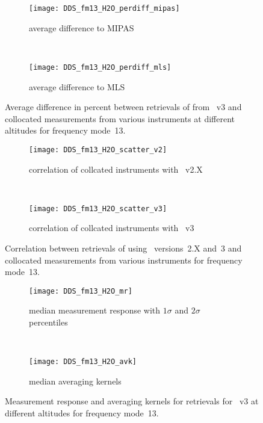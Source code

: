 
\begin{figure}[htpb]
    \centering
    \begin{subfigure}[b]{0.49\textwidth}
        \texttt{[image: DDS\_fm13\_H2O\_perdiff\_mipas]}
        \caption{average difference to MIPAS}
        \label{fig:fm13:H2O:profiles:MIPAS}
    \end{subfigure}
    \,
    \begin{subfigure}[b]{0.49\textwidth}
        \texttt{[image: DDS\_fm13\_H2O\_perdiff\_mls]}
        \caption{average difference to MLS}
        \label{fig:fm13:H2O:profiles:MLS}
    \end{subfigure}
    \caption{Average difference in percent between retrievals of 
    from \smr~v3 and collocated measurements from various instruments at
    different altitudes for frequency mode~13.}

    \label{fig:fm13:H2O:profiles}
\end{figure}

\begin{figure}[htpb]
    \centering
    \begin{subfigure}[b]{0.49\textwidth}
        \texttt{[image: DDS\_fm13\_H2O\_scatter\_v2]}
        \caption{correlation of collcated instruments with \smr~v2.X}
        \label{fig:fm13:H2O:scatter:v2}
    \end{subfigure}
    \,
    \begin{subfigure}[b]{0.49\textwidth}
        \texttt{[image: DDS\_fm13\_H2O\_scatter\_v3]}
        \caption{correlation of collcated instruments with \smr~v3}
        \label{fig:fm13:H2O:scatter:v3}
    \end{subfigure}
    \caption{Correlation between retrievals of  using \smr\
    versions~2.X and~3 and collocated measurements from various instruments
    for frequency mode~13.}
    \label{fig:fm13:H2O:scatter}
\end{figure}

\begin{figure}[htpb]
    \centering
    \begin{subfigure}[b]{0.49\textwidth}
        \texttt{[image: DDS\_fm13\_H2O\_mr]}
        \caption{median measurement response with $1\sigma$ and $2\sigma$
        percentiles}
        \label{fig:fm13:H2O:mr}
    \end{subfigure}
    \,
    \begin{subfigure}[b]{0.49\textwidth}
        \texttt{[image: DDS\_fm13\_H2O\_avk]}
        \caption{median averaging kernels}
        \label{fig:fm13:H2O:avk}
    \end{subfigure}
    \caption{Measurement response and averaging kernels for 
    retrievals for \smr~v3 at different altitudes for frequency mode~13.}
    \label{fig:fm13:H2O:mr_avk}
\end{figure}


